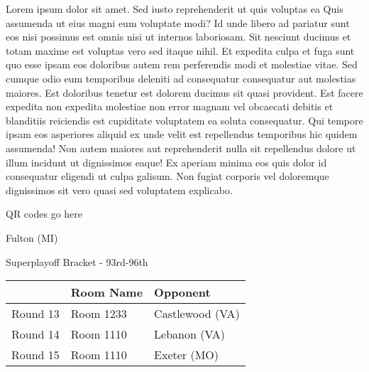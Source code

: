 \documentclass{article}%
\begin{document}
\vspace*{8pt}%
\linebreak%
\newline%
\newline%
Lorem ipsum dolor sit amet. Sed iusto reprehenderit ut quis voluptas ea Quis assumenda ut eius magni eum voluptate modi? Id unde libero ad pariatur sunt eos nisi possimus est omnis nisi ut internos laboriosam. Sit nesciunt ducimus et totam maxime est voluptas vero sed itaque nihil. Et expedita culpa et fuga sunt quo esse ipsam eos doloribus autem rem perferendis modi et molestiae vitae.\newline%
\newline%
Sed cumque odio eum temporibus deleniti ad consequatur consequatur aut molestias maiores. Est doloribus tenetur est dolorem ducimus sit quasi provident. Est facere expedita non expedita molestiae non error magnam vel obcaecati debitis et blanditiis reiciendis est cupiditate voluptatem ea soluta consequatur. Qui tempore ipsam eos asperiores aliquid ex unde velit est repellendus temporibus hic quidem assumenda!\newline%
\newline%
Non autem maiores aut reprehenderit nulla sit repellendus dolore ut illum incidunt ut dignissimos eaque! Ex aperiam minima eos quis dolor id consequatur eligendi ut culpa galisum. Non fugiat corporis vel doloremque dignissimos sit vero quasi sed voluptatem explicabo.\newline%
\newline%
%
\vspace*{30pt}%
\begin{center}%
\begin{Huge}%
QR codes go here%
\end{Huge}%
\end{center}%
\newpage%
\begin{center}%
\begin{Huge}%
Fulton (MI)%
\end{Huge}%
\vspace*{8pt}%
\linebreak%
\begin{Large}%
Superplayoff Bracket {-} 93rd{-}96th%
\end{Large}%
\end{center}%
%
\begin{tabularx}{\textwidth}{|c|Y|Y|}%
\hline%
&Room Name&Opponent\\%
\hline%
Round 13&Room 1233&Castlewood (VA)\\%
Round 14&Room 1110&Lebanon (VA)\\%
Round 15&Room 1110&Exeter (MO)\\%
\hline%
\end{tabularx}%
\end{document}
